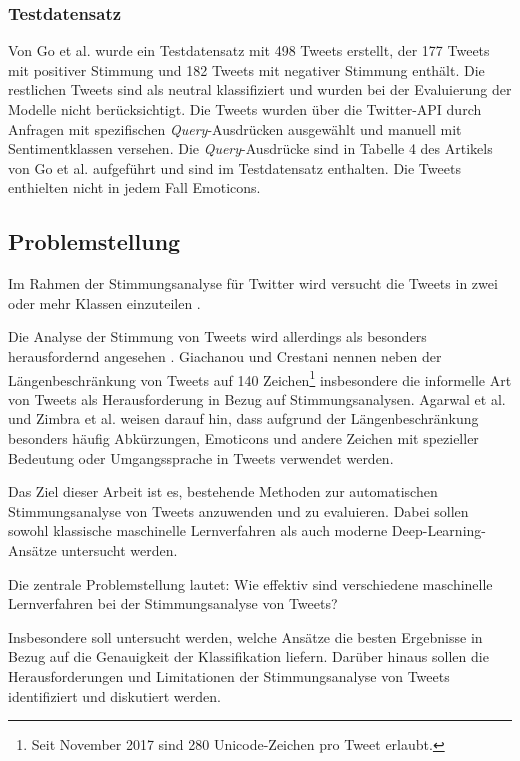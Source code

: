 \subsubsection{Testdatensatz}\label{subsec:testdata}

Von Go et al. \cite{go2009twitter} wurde ein Testdatensatz mit 498 Tweets erstellt, der 177 Tweets mit positiver Stimmung und 182 Tweets mit negativer Stimmung enthält.
Die restlichen Tweets sind als neutral klassifiziert und wurden bei der Evaluierung der Modelle nicht berücksichtigt.
Die Tweets wurden über die Twitter-API durch Anfragen mit spezifischen \textit{Query}-Ausdrücken ausgewählt und manuell mit Sentimentklassen versehen.
Die \textit{Query}-Ausdrücke sind in Tabelle 4 des Artikels von Go et al. \cite[S. 5]{go2009twitter} aufgeführt und sind im Testdatensatz enthalten.
Die Tweets enthielten nicht in jedem Fall Emoticons.

\subsection{Problemstellung}

Im Rahmen der Stimmungsanalyse für Twitter wird versucht die Tweets in zwei oder mehr Klassen einzuteilen \cite{zimbra2018state}.

Die Analyse der Stimmung von Tweets wird allerdings als besonders herausfordernd angesehen \cite{agarwal2011sentiment, giachanou2016like, zimbra2018state}.
Giachanou und Crestani \cite{giachanou2016like} nennen neben der Längenbeschränkung von Tweets auf 140 Zeichen\footnote{
    Seit November 2017 sind 280 Unicode-Zeichen pro Tweet erlaubt.
} insbesondere die informelle Art von Tweets als Herausforderung in Bezug auf Stimmungsanalysen.
Agarwal et al. \cite{agarwal2011sentiment} und Zimbra et al. \cite{zimbra2018state} weisen darauf hin, dass aufgrund der Längenbeschränkung besonders häufig Abkürzungen, Emoticons und andere Zeichen mit spezieller Bedeutung oder Umgangssprache in Tweets verwendet werden.

Das Ziel dieser Arbeit ist es, bestehende Methoden zur automatischen Stimmungsanalyse von Tweets anzuwenden und zu evaluieren.
Dabei sollen sowohl klassische maschinelle Lernverfahren als auch moderne Deep-Learning-Ansätze untersucht werden.

Die zentrale Problemstellung lautet: Wie effektiv sind verschiedene maschinelle Lernverfahren bei der Stimmungsanalyse von Tweets?

Insbesondere soll untersucht werden, welche Ansätze die besten Ergebnisse in Bezug auf die Genauigkeit der Klassifikation liefern.
Darüber hinaus sollen die Herausforderungen und Limitationen der Stimmungsanalyse von Tweets identifiziert und diskutiert werden.
